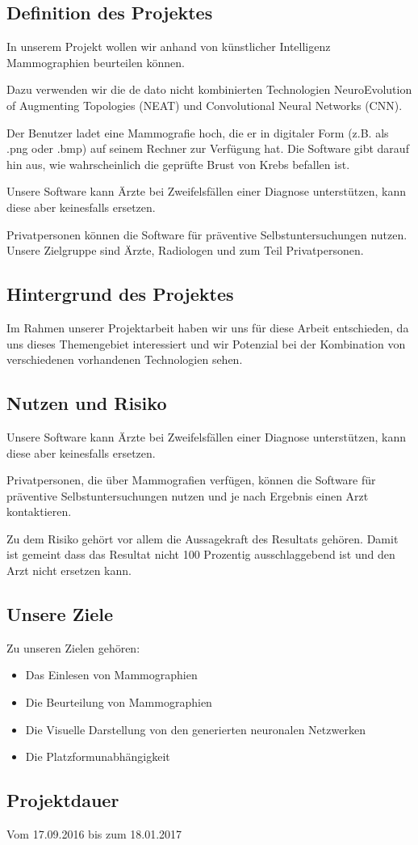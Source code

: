 \documentclass[11pt]{article}
\begin{document}
	\subsection{Definition des Projektes}
	In unserem Projekt wollen wir anhand von künstlicher Intelligenz Mammographien beurteilen können.  
	
	Dazu verwenden wir die de dato nicht kombinierten Technologien NeuroEvolution of Augmenting Topologies (NEAT) und Convolutional Neural Networks (CNN).  
	
	Der Benutzer ladet eine Mammografie hoch, die er in digitaler Form (z.B. als
	.png oder .bmp) auf seinem Rechner zur Verfügung hat. Die Software gibt
	darauf hin aus, wie wahrscheinlich die geprüfte Brust von Krebs befallen ist.  
	
	Unsere Software kann Ärzte bei Zweifelsfällen einer Diagnose unterstützen,
	kann diese aber keinesfalls ersetzen.  
	
	Privatpersonen können die Software für
	präventive Selbstuntersuchungen nutzen.
	Unsere Zielgruppe sind Ärzte, Radiologen und zum Teil Privatpersonen.

	
	\subsection{Hintergrund des Projektes}
	Im Rahmen unserer Projektarbeit haben wir uns für diese Arbeit entschieden, da uns dieses Themengebiet interessiert und wir Potenzial bei der Kombination von verschiedenen vorhandenen Technologien sehen.  

	\subsection{Nutzen und Risiko}
	Unsere Software kann Ärzte bei Zweifelsfällen einer Diagnose unterstützen,
	kann diese aber keinesfalls ersetzen.  
	
	Privatpersonen, die über Mammografien verfügen, können die Software für
	präventive Selbstuntersuchungen nutzen und je nach Ergebnis einen Arzt
	kontaktieren.  
	
	Zu dem Risiko gehört vor allem die Aussagekraft des Resultats gehören. Damit ist gemeint dass das Resultat nicht 100 Prozentig ausschlaggebend ist und den Arzt nicht ersetzen kann.  
	\newpage
	\subsection{Unsere Ziele}
	Zu unseren Zielen gehören:  
	
	\begin{itemize}
		\item{Das Einlesen von Mammographien}
		\item{Die Beurteilung von Mammographien}
		\item{Die Visuelle Darstellung von den generierten neuronalen Netzwerken}
		\item{Die Platzformunabhängigkeit}
	\end{itemize}
	\subsection{Projektdauer}
	Vom 17.09.2016 bis zum 18.01.2017
	
	
\end{document}
